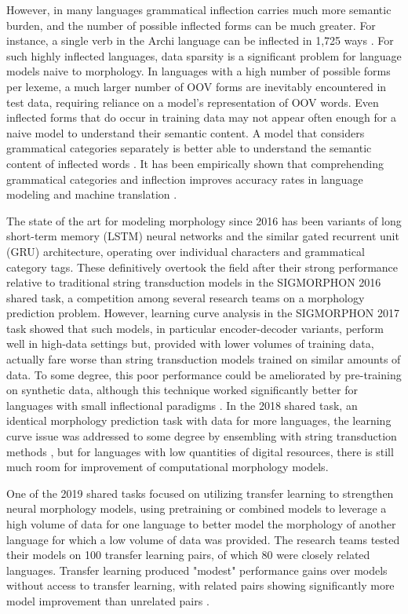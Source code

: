 However, in many languages grammatical inflection carries much more semantic burden, and the number of possible inflected forms can be much greater. For instance, a single verb in the Archi language can be inflected in 1,725 ways \parencite{Kibrik1994}. For such highly inflected languages, data sparsity is a significant problem for language models naive to morphology. In languages with a high number of possible forms per lexeme, a much larger number of OOV forms are inevitably encountered in test data, requiring reliance on a model's representation of OOV words. Even inflected forms that do occur in training data may not appear often enough for a naive model to understand their semantic content. A model that considers grammatical categories separately is better able to understand the semantic content of inflected words \parencite{Cotterell2016}. It has been empirically shown that comprehending grammatical categories and inflection improves accuracy rates in language modeling and machine translation \parencite{Faruqui2015}.

The state of the art for modeling morphology since 2016 has been variants of long short-term memory (LSTM) neural networks and the similar gated recurrent unit (GRU) architecture, operating over individual characters and grammatical category tags. These definitively overtook the field after their strong performance relative to traditional string transduction models in the SIGMORPHON 2016 shared task, a competition among several research teams on a morphology prediction problem. However, learning curve analysis in the SIGMORPHON 2017 task showed that such models, in particular encoder-decoder variants, perform well in high-data settings but, provided with lower volumes of training data, actually fare worse than string transduction models trained on similar amounts of data. To some degree, this poor performance could be ameliorated by pre-training on synthetic data, although this technique worked significantly better for languages with small inflectional paradigms \parencite{Cotterell2017a}. In the 2018 shared task, an identical morphology prediction task with data for more languages, the learning curve issue was addressed to some degree by ensembling with string transduction methods \parencite{Cotterell2018b}, but for languages with low quantities of digital resources, there is still much room for improvement of computational morphology models.

One of the 2019 shared tasks focused on utilizing transfer learning to strengthen neural morphology models, using pretraining or combined models to leverage a high volume of data for one language to better model the morphology of another language for which a low volume of data was provided. The research teams tested their models on 100 transfer learning pairs, of which 80 were closely related languages. Transfer learning produced "modest" performance gains over models without access to transfer learning, with related pairs showing significantly more model improvement than unrelated pairs \parencite{McCarthy2019}.


